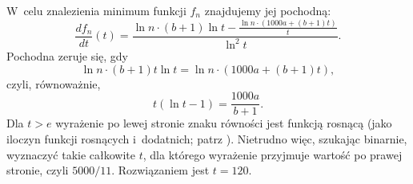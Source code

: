 W~celu znalezienia minimum funkcji $f_n$ znajdujemy jej pochodną:
\[
	\frac{df_n}{dt}(t) = \frac{\ln n\cdot(b+1)\ln t-\frac{\ln n\cdot(1000a+(b+1)t)}{t}}{\ln^2t}.
\]
Pochodna zeruje się, gdy
\[
	\ln n\cdot(b+1)t\ln t = \ln n\cdot(1000a+(b+1)t),
\]
czyli, równoważnie,
\[
	t(\ln t-1) = \frac{1000a}{b+1}.
\]
Dla $t>e$ wyrażenie po lewej stronie znaku równości jest funkcją rosnącą (jako iloczyn funkcji rosnących i~dodatnich; patrz ).
Nietrudno więc, szukając binarnie, wyznaczyć takie całkowite $t$, dla którego wyrażenie przyjmuje wartość po prawej stronie, czyli $5000/11$.
Rozwiązaniem jest $t=120$.
